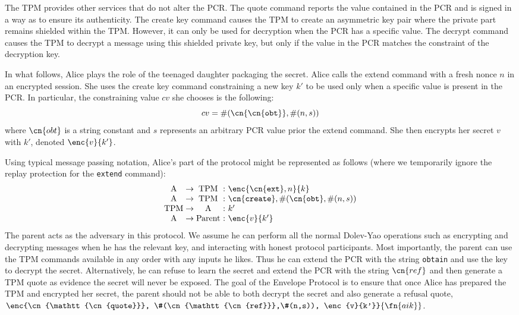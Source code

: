 The TPM provides other services that do not alter the PCR.  The
\textsf{quote} command reports the value contained in the PCR and is
signed in a way as to ensure its authenticity.  The \textsf{create
  key} command causes the TPM to create an asymmetric key pair where
the private part remains shielded within the TPM.  However, it can
only be used for decryption when the PCR has a specific value.  The
\textsf{decrypt} command causes the TPM to decrypt a message using
this shielded private key, but only if the value in the PCR matches
the constraint of the decryption key.

In what follows, Alice plays the role of the teenaged daughter
packaging the secret. Alice calls the \textsf{extend} command with a
fresh nonce $n$ in an encrypted session.  She uses the \textsf{create
  key} command constraining a new key $k'$ to be used only when a
specific value is present in the PCR.  In particular, the constraining
value $cv$ she chooses is the following:
$$ cv = \#(\cn{\mathtt{\cn{obt}}},\#(n,s)) $$ where $\cn{obt}$ is a
string constant and $s$ represents an arbitrary PCR value prior the
extend command.  She then encrypts her secret $v$ with $k'$, denoted
$\enc{v}{k'}$.

Using typical message passing notation, Alice's part of the protocol
might be represented as follows (where we temporarily ignore the
replay protection for the \texttt{extend} command):\\

\noindent
$$
\begin{array}{c@{{}\to{}}c@{~:~}l}
\mathrm{A} & \mathrm{TPM} & \enc{\mathtt{\cn{ext}},n}{k}\\
\mathrm{A} & \mathrm{TPM} & \mathtt{\cn{create}},
\#(\mathtt{\cn{obt}},\#(n,s)) \\
\mathrm{TPM} & \mathrm{A} & k'\\
\mathrm{A} & \mathrm{Parent} & \enc{v}{k'}\\
\end{array}
$$
%
The parent acts as the adversary in this protocol. We assume he can
perform all the normal Dolev-Yao operations such as encrypting and
decrypting messages when he has the relevant key, and interacting with
honest protocol participants. Most importantly, the parent can use the
TPM commands available in any order with any inputs he likes. Thus he
can extend the PCR with the string \texttt{obtain} and use the key to
decrypt the secret.  Alternatively, he can refuse to learn the secret
and extend the PCR with the string $\cn{ref}$ and then generate a TPM
quote as evidence the secret will never be exposed. The goal of the
Envelope Protocol is to ensure that once Alice has prepared the TPM
and encrypted her secret, the parent should not be able to both
decrypt the secret and also generate a refusal quote,
$\enc{\cn{\mathtt{\cn{quote}}},
  \#(\cn{\mathtt{\cn{ref}}},\#(n,s)), \enc{v}{k'}}{\fn{aik}}$.

